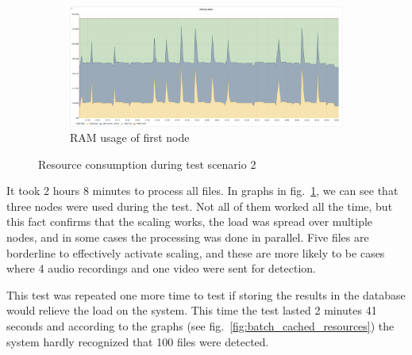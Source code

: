 \begin{figure}[H]
    \hfill
    \begin{subfigure}[h]{0.5\linewidth}
        \centering
        \includegraphics[width=1\linewidth]{other-fig/tests/burst_ram1.png}
        \caption{RAM usage of first node}
    \end{subfigure}
    \caption{Resource consumption during test scenario 2}
    \label{fig:batch_resources}
\end{figure}

It took 2 hours 8 minutes to process all files. In graphs in fig.~\ref{fig:batch_resources}, we can see that three nodes were used during the test. Not all of them worked all the time, but this fact confirms that the scaling works, the load was spread over multiple nodes, and in some cases the processing was done in parallel. Five files are borderline to effectively activate scaling, and these are more likely to be cases where 4 audio recordings and one video were sent for detection.

This test was repeated one more time to test if storing the results in the database would relieve the load on the system. This time the test lasted 2 minutes 41 seconds and according to the graphs (see fig.~\ref{fig:batch_cached_resources}) the system hardly recognized that 100 files were detected.

